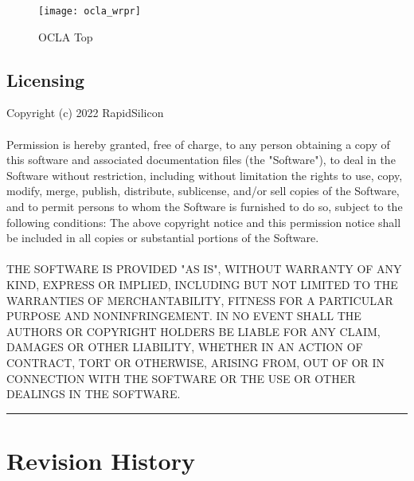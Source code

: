 \documentclass[phv, 11pt ]{SelfArx} %
\begin{document}
{\begin{figure}[h]\centering %
	\texttt{[image: ocla\_wrpr]}
	\caption{OCLA Top}
	\label{fig:ocla_wrpr}
\end{figure}
\newpage
\subsection*{\fontsize{14}{16}\selectfont Licensing}

Copyright (c) 2022 RapidSilicon \\ \\
Permission is hereby granted, free of charge, to any person obtaining a copy of
this software and associated documentation files (the "Software"), to deal in
the Software without restriction, including without limitation the rights to
use, copy, modify, merge, publish, distribute, sublicense, and/or sell copies of
the Software, and to permit persons to whom the Software is furnished to do so,
subject to the following conditions: The above copyright notice and this
permission notice shall be included in all copies or substantial portions of the
Software.
\\ \\
THE SOFTWARE IS PROVIDED "AS IS", WITHOUT WARRANTY OF ANY KIND, EXPRESS OR
IMPLIED, INCLUDING BUT NOT LIMITED TO THE WARRANTIES OF MERCHANTABILITY, FITNESS
FOR A PARTICULAR PURPOSE AND NONINFRINGEMENT. IN NO EVENT SHALL THE AUTHORS OR
COPYRIGHT HOLDERS BE LIABLE FOR ANY CLAIM, DAMAGES OR OTHER LIABILITY, WHETHER
IN AN ACTION OF CONTRACT, TORT OR OTHERWISE, ARISING FROM, OUT OF OR IN
CONNECTION WITH THE SOFTWARE OR THE USE OR OTHER DEALINGS IN THE SOFTWARE.
\par\noindent\rule{\textwidth}{0.4pt}



% 




\raggedright%


\newpage
\section*{\hfill  Revision History}

}
\end{document}
